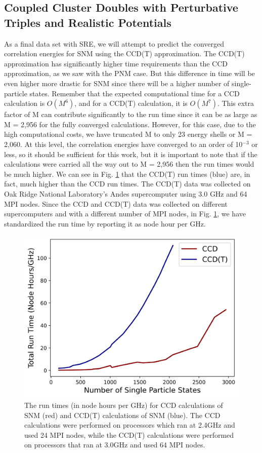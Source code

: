 \subsection{Coupled Cluster Doubles with Perturbative Triples and Realistic Potentials}

As a final data set with SRE, we will attempt to predict the converged correlation energies for SNM using the CCD(T) approximation.  The CCD(T) approximation has significantly higher time requirements than the CCD approximation, as we saw with the PNM case.  But this difference in time will be even higher more drastic for SNM since there will be a higher number of single-particle states. Remember that the expected computational time for a CCD calculation is $O(M^6)$, and for a CCD(T) calculation, it is $O(M^7)$.  This extra factor of M can contribute significantly to the run time since it can be as large as M = 2,956 for the fully converged calculations.  However, for this case, due to the high computational costs, we have truncated M to only 23 energy shells or M = 2,060.  At this level, the correlation energies have converged to an order of 10$^{-3}$ or less, so it should be sufficient for this work, but it is important to note that if the calculations were carried all the way out to M = 2,956 then the run times would be much higher.  We can see in Fig. \ref{fig:snm_ccdt_pert_times} that the CCD(T) run times (blue) are, in fact, much higher than the CCD run times.  The CCD(T) data was collected on Oak Ridge National Laboratory's Andes supercomputer using 3.0 GHz and 64 MPI nodes.  Since the CCD and CCD(T) data was collected on different supercomputers and with a different number of MPI nodes, in Fig. \ref{fig:snm_ccdt_pert_times}, we have standardized the run time by reporting it as node hour per GHz.

\begin{figure}
    \centering
    \includegraphics[scale=0.75]{Images/Chapter8/PRX_ORNL1_Fig2b.png}
    \caption{The run times (in node hours per GHz) for CCD calculations of SNM (red) and CCD(T) calculations of SNM (blue).  The CCD calculations were performed on processors which ran at 2.4GHz and used 24 MPI nodes, while the CCD(T) calculations were performed on processors that ran at 3.0GHz and used 64 MPI nodes.}
    \label{fig:snm_ccdt_pert_times}
\end{figure}

